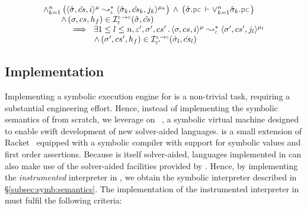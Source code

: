 \begin{corollary}[Verification]\label{corollary:verification}
$$
\begin{array}{l}
\wedge_{k=1}^n \, \big( \transabssemrule{\sstate, \scs, i}{\sstate_k, \scs_k, j_k}{\mode}{\mode_k}{\symbolic}  \big)
    \, \wedge \, \big( \sstate.\pcsel \vdash \vee_{k=1}^n \sstate_k.\pcsel \big)  \\ \quad \quad
    \, \wedge \, (\jstate, \cs, \heap_f) \in \interpret{\symbconc}{\senv}(\sstate, \scs)
    \\ \quad \quad  \quad 
%
      \ \implies \ \exists 1 \leq l \leq n, \senv', \jstate', \cs' \, . \, 
           \transabssemrule{\jstate, \cs, i}{\jstate', \cs', j_l}{\mode}{\mode_l}{\concrete} \\ \quad \quad \quad \quad \quad \quad 
           \, \wedge \, 
           (\jstate', \cs', \heap_f) \in \interpret{\symbconc}{\senv'}(\sstate_l, \scs_l)
\end{array}
$$
\end{corollary}

%

%
%
%


\subsection{Implementation}\label{subsec:jsil:analysis:implementation}


Implementing a symbolic execution engine for \jsil is a non-trivial 
task, requiring a substantial engineering effort. 
% 
% 
Hence, instead of implementing the symbolic semantics of \jsil from scratch, we leverage on 
\rosette~\cite{Rosette1,Rosette2}, a symbolic virtual machine designed to 
enable swift development of new 
solver-aided languages. 
%
\rosette is a small extension of Racket~\cite{racket} equipped with a symbolic compiler with support 
for symbolic values and first order assertions. Because \rosette is itself solver-aided, languages 
implemented in \rosette can also make use of the solver-aided facilities provided by \rosette. 
Hence, by implementing the \emph{instrumented} \jsil interpreter in \rosette, we obtain the symbolic 
interpreter described in \S\ref{subsec:symb:semantics}. %
%
The implementation of the instrumented interpreter in \rosette must fulfil the following criteria:

